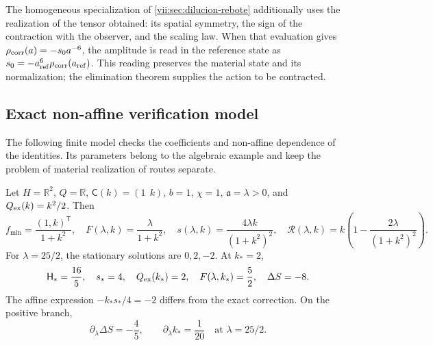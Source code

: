 The homogeneous specialization of
\ref{vii:sec:dilucion-rebote} additionally uses the realization of the
tensor obtained: its spatial symmetry, the sign of the contraction
with the observer, and the scaling law. When that evaluation gives
\(\rho_{\rm corr}(a)=-s_0a^{-6}\), the amplitude is read in the
reference state as
\(s_0=-a_{\rm ref}^{6}\rho_{\rm corr}(a_{\rm ref})\).
This reading preserves the material state and its normalization; the
elimination theorem supplies the action to be contracted.

\subsection{Exact non-affine verification model}
\label{vii:subsec:control-no-afin}

The following finite model checks the coefficients and non-affine
dependence of the identities. Its parameters belong to
the algebraic example and keep the problem of
material realization of routes separate.

\begin{proposition}
\label{vii:prop:ejemplo-no-afin}
Let \(H=\mathbb R^2\), \(Q=\mathbb R\),
\(\mathsf C(k)=(1\ \ k)\), \(b=1\), \(\chi=1\),
\(\mathfrak a=\lambda>0\), and \(Q_{\rm ex}(k)=k^2/2\).
Then
\begin{equation}
 f_{\min}=\frac{(1,k)^{\mathsf T}}{1+k^2},\quad
 F(\lambda,k)=\frac{\lambda}{1+k^2},\quad
 s(\lambda,k)=\frac{4\lambda k}{(1+k^2)^2},\quad
 \mathcal R(\lambda,k)
    =k\left(1-\frac{2\lambda}{(1+k^2)^2}\right).
 \label{vii:eq:ejemplo-minimo-no-afin}
\end{equation}
For \(\lambda=25/2\), the stationary solutions are
\(0,2,-2\). At \(k_*=2\),
\begin{equation}
 \mathsf H_*=\frac{16}{5},\quad s_*=4,\quad
 Q_{\rm ex}(k_*)=2,\quad F(\lambda,k_*)=\frac52,
 \quad \Delta S=-8.
 \label{vii:eq:valores-ejemplo-no-afin}
\end{equation}
The affine expression \(-k_*s_*/4=-2\) differs from the exact
correction. On the positive branch,
\begin{equation}
 \partial_\lambda\Delta S=-\frac45,
 \qquad \partial_\lambda k_* =\frac1{20}
 \quad\text{at }\lambda=25/2.
 \label{vii:eq:derivadas-ejemplo-no-afin}
\end{equation}
\end{proposition}

